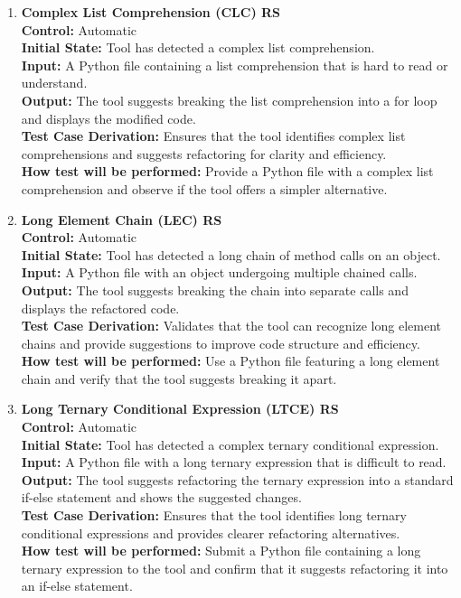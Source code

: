 \documentclass[12pt, titlepage]{article}
\begin{document}
\begin{enumerate}[label={\bf \textcolor{Maroon}{test-FR-RS-\arabic*}}, wide=0pt, font=\itshape]
  \item \textbf{Complex List Comprehension (CLC) RS}\\[2mm]
    \textbf{Control:} Automatic \\
    \textbf{Initial State:} Tool has detected a complex list comprehension.\\
    \textbf{Input:} A Python file containing a list comprehension that is hard to read or understand.\\
    \textbf{Output:} The tool suggests breaking the list comprehension into a for loop and displays the modified code.\\[2mm]
    \textbf{Test Case Derivation:} Ensures that the tool identifies complex list comprehensions and suggests refactoring for clarity and efficiency.\\[2mm]
    \textbf{How test will be performed:} Provide a Python file with a complex list comprehension and observe if the tool offers a simpler alternative.
  
  \item \textbf{Long Element Chain (LEC) RS}\\[2mm]
    \textbf{Control:} Automatic \\
    \textbf{Initial State:} Tool has detected a long chain of method calls on an object.\\
    \textbf{Input:} A Python file with an object undergoing multiple chained calls.\\
    \textbf{Output:} The tool suggests breaking the chain into separate calls and displays the refactored code.\\[2mm]
    \textbf{Test Case Derivation:} Validates that the tool can recognize long element chains and provide suggestions to improve code structure and efficiency.\\[2mm]
    \textbf{How test will be performed:} Use a Python file featuring a long element chain and verify that the tool suggests breaking it apart.
  
  \item \textbf{Long Ternary Conditional Expression (LTCE) RS}\\[2mm]
    \textbf{Control:} Automatic \\
    \textbf{Initial State:} Tool has detected a complex ternary conditional expression.\\
    \textbf{Input:} A Python file with a long ternary expression that is difficult to read.\\
    \textbf{Output:} The tool suggests refactoring the ternary expression into a standard if-else statement and shows the suggested changes.\\[2mm]
    \textbf{Test Case Derivation:} Ensures that the tool identifies long ternary conditional expressions and provides clearer refactoring alternatives.\\[2mm]
    \textbf{How test will be performed:} Submit a Python file containing a long ternary expression to the tool and confirm that it suggests refactoring it into an if-else statement.
  

\end{enumerate}
\end{document}
